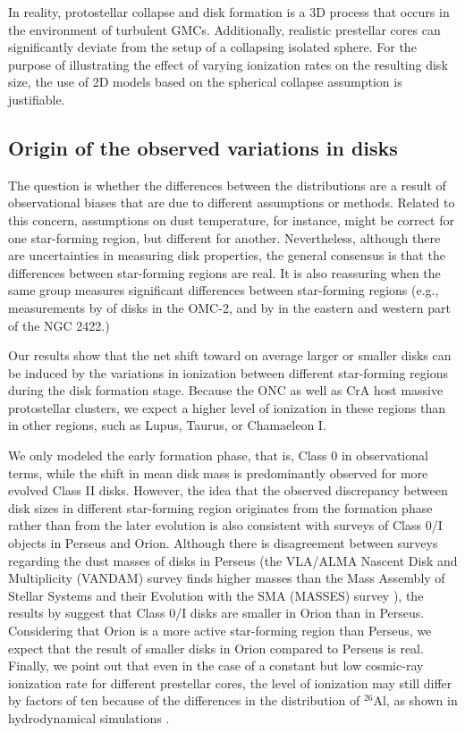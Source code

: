 \documentclass{aa}
\begin{document}
In reality, protostellar collapse and disk formation is a 3D process that occurs in the environment of turbulent GMCs. Additionally, realistic prestellar cores can significantly deviate from the setup of a collapsing isolated sphere. 
For the purpose of illustrating the effect of varying ionization rates on the resulting disk size, the use of 2D models based on the spherical collapse assumption is justifiable.  


\subsection{Origin of the observed variations in disks}
The question is whether the differences between the distributions are a result of observational biases that are due to different assumptions or methods. 
Related to this concern, assumptions on  dust temperature, for instance, might be correct for one star-forming region, but different for another.
Nevertheless, although there are uncertainties in measuring disk properties, the general consensus is that the differences between star-forming regions are real. 
It is also reassuring when the same group measures significant differences between star-forming regions (e.g., measurements by \citet{vanTerwisga2019} of disks in the OMC-2, and by \cite{vanTerwisga2020} in the eastern and western part of the NGC 2422.)

Our results show that the net shift toward on average larger or smaller disks can be induced by the variations in ionization between different star-forming regions during the disk formation stage.
Because the ONC as well as CrA host massive protostellar clusters, we expect a higher level of ionization in these regions than in other regions, such as Lupus, Taurus, or Chamaeleon I.

We only modeled the early formation phase, that is, Class 0 in observational terms, while the shift in mean disk mass is predominantly observed for more evolved Class II disks. 
However, the idea that the observed discrepancy between disk sizes in different star-forming region originates from the formation phase rather than from the later evolution is also consistent with surveys of Class 0/I objects in Perseus and Orion. 
Although there is disagreement between surveys regarding the dust masses of disks in Perseus (the VLA/ALMA Nascent Disk and Multiplicity (VANDAM) survey \citep{Tychoniec2018} finds higher masses than the Mass Assembly of Stellar Systems and their Evolution with the SMA (MASSES) survey \citep{Andersen2019}), the results by \citet{Tobin2020} suggest that Class 0/I disks are smaller in Orion than in Perseus. 
Considering that Orion is a more active star-forming region than Perseus, we expect that the result of smaller disks in Orion compared to Perseus is real.  
Finally, we point out that even in the case of a constant but low cosmic-ray ionization rate for different prestellar cores, the level of ionization may still differ by factors of ten because of the differences in the distribution of $^{26}$Al, as shown in hydrodynamical simulations \citep{Vasileiadis2013,Kuffmeier2016,Fujimoto2018}.
\end{document}

